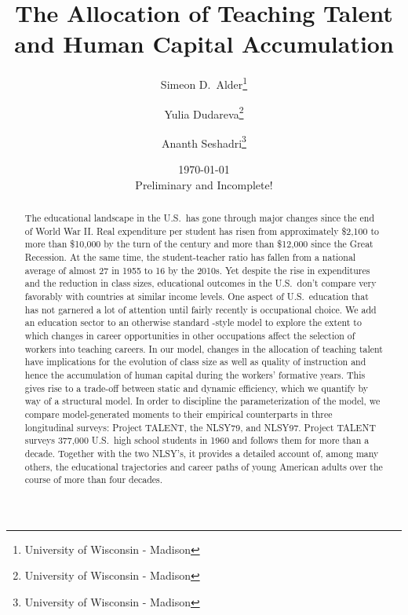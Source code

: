 \documentclass[onehalfspacing,11pt]{article}
\begin{document}
\begin{titlepage}
\title{The Allocation of Teaching Talent and Human Capital Accumulation}
\author{Simeon D.~Alder\footnote{University of Wisconsin - Madison} \and Yulia Dudareva\footnote{University of Wisconsin - Madison} \and Ananth Seshadri\footnote{University of Wisconsin - Madison}}
\date{\today \\ \vspace{5mm} {\sc Preliminary and Incomplete!}}

\maketitle

\begin{abstract}
The educational landscape in the U.S.~has gone through major changes since the end of World War II. Real expenditure per student has risen from approximately \$2,100 to more than \$10,000 by the turn of the century and more than \$12,000 since the Great Recession. At the same time, the student-teacher ratio has fallen from a national average of almost 27 in 1955 to 16 by the 2010s. Yet despite the rise in expenditures and the reduction in class sizes, educational outcomes in the U.S.~don't compare very favorably with countries at similar income levels. One aspect of U.S.~education that has not garnered a lot of attention until fairly recently is occupational choice. We add an education sector to an otherwise standard \cite{Hsieh:2018}-style model to explore the extent to which changes in career opportunities in other occupations affect the selection of workers into teaching careers. In our model, changes in the allocation of teaching talent have implications for the evolution of class size as well as quality of instruction and hence the accumulation of human capital during the workers' formative years. This gives rise to a trade-off between static and dynamic efficiency, which we quantify by way of a structural model. In order to discipline the parameterization of the model, we compare model-generated moments to their empirical counterparts in three longitudinal surveys: Project TALENT, the NLSY79, and NLSY97. Project TALENT surveys 377,000 U.S.~high school students in 1960 and follows them for more than a decade. Together with the two NLSY's, it provides a detailed account of, among many others, the educational trajectories and career paths of young American adults over the course of more than four decades.
\end{abstract}
\end{titlepage}
\end{document}
